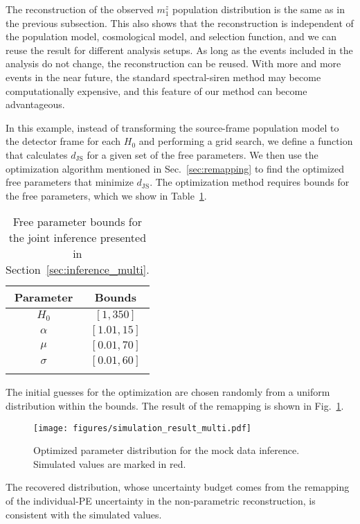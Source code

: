 \documentclass[sn-aps, pdflatex, iicol]{sn-jnl}
\begin{document}
The reconstruction of the observed $m^z_1$ population distribution is the same as in the previous subsection.
This also shows that the reconstruction is independent of the population model, cosmological model, and selection function, and we can reuse the result for different analysis setups.
As long as the events included in the analysis do not change, the reconstruction can be reused.
With more and more events in the near future, the standard spectral-siren method may become computationally expensive, and this feature of our method can become advantageous.

In this example, instead of transforming the source-frame population model to the detector frame for each $H_0$ and performing a grid search, we define a function that calculates $d_\mathrm{JS}$ for a given set of the free parameters.
We then use the optimization algorithm mentioned in Sec.~\ref{sec:remapping} to find the optimized free parameters that minimize $d_\mathrm{JS}$.
The optimization method requires bounds for the free parameters, which we show in Table~\ref{tab:bounds}.
\begin{table}[htbp]
    \caption{Free parameter bounds for the joint inference presented in Section~\ref{sec:inference_multi}.}
    \begin{tabular}{cc}
        \toprule
        Parameter & Bounds \\
        \midrule
        $H_0$ & $[1, 350]$ \\
        $\alpha$ & $[1.01, 15]$ \\
        $\mu$ & $[0.01, 70]$ \\
        $\sigma$ & $[0.01, 60]$ \\
        \botrule
    \end{tabular}
    \label{tab:bounds}
\end{table}
The initial guesses for the optimization are chosen randomly from a uniform distribution within the bounds.
The result of the remapping is shown in Fig.~\ref{fig:simulation_result_multi}.
\begin{figure}
    \texttt{[image: figures/simulation\_result\_multi.pdf]}
    \caption{
        Optimized parameter distribution for the mock data inference.
        Simulated values are marked in red.
    }
    \label{fig:simulation_result_multi}
\end{figure}
The recovered distribution, whose uncertainty budget comes from the remapping of the individual-\ac{PE} uncertainty in the non-parametric reconstruction, is consistent with the simulated values.
\end{document}
